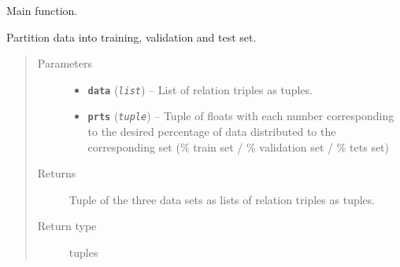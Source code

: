 \documentclass[letterpaper,10pt,english]{sphinxmanual}
\begin{document}

\begin{fulllineitems}
\label{src.trans_e:src.trans_e.partition_data.main}
Main function.

\end{fulllineitems}


\begin{fulllineitems}
\label{src.trans_e:src.trans_e.partition_data.partition_data}
\end{fulllineitems}


\begin{fulllineitems}
\label{src.trans_e:src.trans_e.partition_data.partition_relation_wise}
Partition data into training, validation and test set.
\begin{quote}\begin{description}
\item[{Parameters}] \leavevmode\begin{itemize}
\item {} 
\textbf{\texttt{data}} (\emph{\texttt{list}}) -- List of relation triples as tuples.

\item {} 
\textbf{\texttt{prts}} (\emph{\texttt{tuple}}) -- Tuple of floats with each number corresponding to the desired percentage of data distributed to
the corresponding set (\% train set / \% validation set / \% tets set)

\end{itemize}

\item[{Returns}] \leavevmode
Tuple of the three data sets as lists of relation triples as tuples.

\item[{Return type}] \leavevmode
tuples

\end{description}\end{quote}

\end{fulllineitems}
\end{document}
